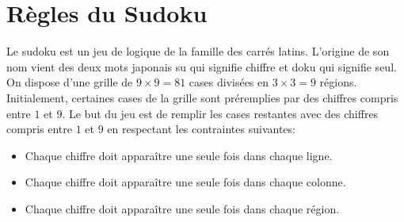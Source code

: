 \documentclass{magnolia}
\begin{document}


\tikzset{
xmin/.store in=\xmin, xmin/.default=-3, xmin=-3,
xmax/.store in=\xmax, xmax/.default=3, xmin=3,
ymin/.store in=\ymin, ymin/.default=-3, ymin=-3,
ymax/.store in=\ymax, ymax/.default=-3, ymax=-3,
}

\usetikzlibrary{matrix}

\newcommand{\grille}{\draw[help lines] (\xmin,\ymin) grid (\xmax,\ymax);}

\newcommand{\axes}{%
\draw[->] (\xmin,0)--(\xmax,0);
\draw[->] (0,\ymin)--(0,\ymax);
\draw[->][very thick] (0,0)--(1,0);
\draw (0.5 , 0) node[below] {$\vec{\imath}$};
\draw[->] [very thick](0,0)--(0,1);
\draw (0 , 0.5) node[left] {$\vec{\jmath}$};
}

\newcommand{\axesbis}{%
\draw[->] (\xmin,0)--(\xmax,0)node[below]{$x$};
\draw[->] (0,\ymin)--(0,\ymax)node[left]{$y$};
}
\newcommand{\aaa}{\hphantom{\hspace{0.5cm}}\vphantom{9}}

\section{Règles du Sudoku}

Le sudoku est un jeu de logique de la famille des carrés latins. L'origine de son nom vient des deux mots japonais \og su \fg{} qui signifie chiffre et \og doku \fg{} qui signifie seul.\\

On dispose d'une grille de $9\times 9=81$ cases divisées en $3\times 3=9$ régions. Initialement, certaines cases de la grille sont préremplies par des chiffres compris entre
$1$ et $9$. Le but du jeu est de remplir les cases restantes avec des chiffres compris
entre $1$ et $9$ en respectant les contraintes suivantes:
\begin{itemize}
\item Chaque chiffre doit apparaître une seule fois dans chaque ligne.
\item Chaque chiffre doit apparaître une seule fois dans chaque colonne.
\item Chaque chiffre doit apparaître une seule fois dans chaque région.
\end{itemize}
\end{document}
